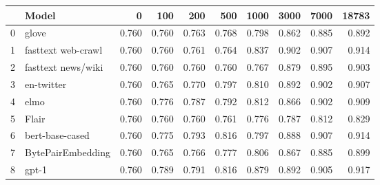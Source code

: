 \begin{tabular}{llrrrrrrrr}
\toprule
{} &               Model &     0 &   100 &   200 &   500 &  1000 &  3000 &  7000 &  18783 \\
\midrule
0 &               glove & 0.760 & 0.760 & 0.763 & 0.768 & 0.798 & 0.862 & 0.885 &  0.892 \\
1 &  fasttext web-crawl & 0.760 & 0.760 & 0.761 & 0.764 & 0.837 & 0.902 & 0.907 &  0.914 \\
2 &  fasttext news/wiki & 0.760 & 0.760 & 0.760 & 0.760 & 0.767 & 0.879 & 0.895 &  0.903 \\
3 &          en-twitter & 0.760 & 0.765 & 0.770 & 0.797 & 0.810 & 0.892 & 0.902 &  0.907 \\
4 &                elmo & 0.760 & 0.776 & 0.787 & 0.792 & 0.812 & 0.866 & 0.902 &  0.909 \\
5 &               Flair & 0.760 & 0.760 & 0.760 & 0.761 & 0.776 & 0.787 & 0.812 &  0.829 \\
6 &     bert-base-cased & 0.760 & 0.775 & 0.793 & 0.816 & 0.797 & 0.888 & 0.907 &  0.914 \\
7 &   BytePairEmbedding & 0.760 & 0.765 & 0.766 & 0.777 & 0.806 & 0.867 & 0.885 &  0.899 \\
8 &               gpt-1 & 0.760 & 0.789 & 0.791 & 0.816 & 0.879 & 0.892 & 0.905 &  0.917 \\
\bottomrule
\end{tabular}
